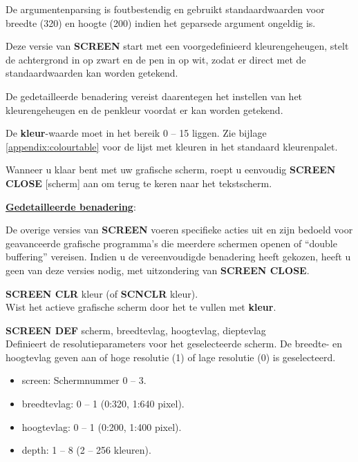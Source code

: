 \begin{description}[leftmargin=2cm,style=nextline]
                  De argumentenparsing is foutbestendig en gebruikt standaardwaarden voor breedte (320) en hoogte (200) indien het geparsede argument ongeldig is.

                  Deze versie van {\bf SCREEN} start met een voorgedefinieerd kleurengeheugen, stelt de achtergrond in op zwart en de pen in op wit, zodat er direct met de standaardwaarden kan worden getekend.

                  De gedetailleerde benadering vereist daarentegen het instellen van het kleurengeheugen en de penkleur voordat er kan worden getekend.

                  De {\bf kleur}-waarde moet in het bereik 0 -- 15 liggen. Zie bijlage \vref{appendix:colourtable} voor de lijst met kleuren in het standaard kleurenpalet.

                  Wanneer u klaar bent met uw grafische scherm, roept u eenvoudig {\bf SCREEN CLOSE} [scherm] aan om terug te keren naar het tekstscherm.

                  \underline{{\bf Gedetailleerde benadering}}:

                  De overige versies van {\bf SCREEN} voeren specifieke acties uit en zijn bedoeld voor geavanceerde grafische programma's die meerdere schermen openen of ``double buffering'' vereisen. Indien u de vereenvoudigde benadering heeft gekozen, heeft u geen van deze versies nodig, met uitzondering van {\bf SCREEN CLOSE}.

{\bf SCREEN CLR} kleur (of {\bf SCNCLR} kleur). \\                  Wist het actieve grafische scherm door het te vullen met {\bf kleur}.

                  {\bf SCREEN DEF} scherm, breedtevlag, hoogtevlag, dieptevlag \\                  Definieert de resolutieparameters voor het geselecteerde scherm. De breedte- en hoogtevlag geven aan of hoge resolutie (1) of lage resolutie (0) is geselecteerd.

                  \begin{itemize}
                     \item screen: Schermnummer 0 -- 3.                     \item breedtevlag: 0 -- 1 (0:320, 1:640 pixel).                     \item hoogtevlag: 0 -- 1 (0:200, 1:400 pixel).                     \item depth: 1 -- 8 (2 -- 256 kleuren).
                  \end{itemize}


\end{description}
